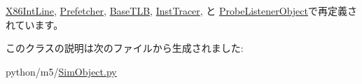 \hyperlink{classX86IntPin_1_1X86IntLine_acce15679d830831b0bbe8ebc2a60b2ca}{X86IntLine}, \hyperlink{classRubyPrefetcher_1_1Prefetcher_acce15679d830831b0bbe8ebc2a60b2ca}{Prefetcher}, \hyperlink{classBaseTLB_1_1BaseTLB_acce15679d830831b0bbe8ebc2a60b2ca}{BaseTLB}, \hyperlink{classInstTracer_1_1InstTracer_acce15679d830831b0bbe8ebc2a60b2ca}{InstTracer}, と \hyperlink{classProbe_1_1ProbeListenerObject_acce15679d830831b0bbe8ebc2a60b2ca}{ProbeListenerObject}で再定義されています。

このクラスの説明は次のファイルから生成されました:\begin{DoxyCompactItemize}
\item 
python/m5/\hyperlink{SimObject_8py}{SimObject.py}\end{DoxyCompactItemize}
